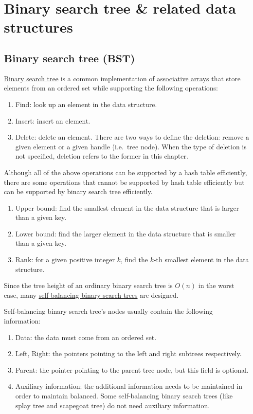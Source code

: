 \chapter{Binary search tree \& related data structures}
\section{Binary search tree (BST)}
\href{https://en.wikipedia.org/wiki/Binary_search_tree}{Binary search tree} is a common implementation of \href{https://en.wikipedia.org/wiki/Associative_array}{associative arrays} that store elements from an ordered set while supporting the following operations:
\begin{enumerate}
    \item Find: look up an element in the data structure.
    \item Insert: insert an element.
    \item Delete: delete an element. There are two ways to define the deletion: remove a given element or a given handle (i.e.\ tree node). When the type of deletion is not specified, deletion refers to the former in this chapter.
\end{enumerate}

Although all of the above operations can be supported by a hash table efficiently, there are some  operations that cannot be supported by hash table efficiently but can be supported by binary search tree efficiently.
\begin{enumerate}
    \item Upper bound: find the smallest element in the data structure that is larger than a given key.
    \item Lower bound: find the larger element in the data structure that is smaller than a given key.
    \item Rank: for a given positive integer $k$, find the $k$-th smallest element in the data structure.
\end{enumerate}

Since the tree height of an ordinary binary search tree is $O(n)$ in the worst case, many \href{https://en.wikipedia.org/wiki/Self-balancing_binary_search_tree}{self-balancing binary search trees} are designed.

Self-balancing binary search tree's nodes usually contain the following information:
\begin{enumerate}
    \item Data: the data must come from an ordered set.
    \item Left, Right: the pointers pointing to the left and right subtrees respectively.
    \item Parent: the pointer pointing to the parent tree node, but this field is optional.
    \item Auxiliary information: the additional information needs to be maintained in order to maintain balanced. Some self-balancing binary search trees (like splay tree and scapegoat tree) do not need auxiliary information.
\end{enumerate}

